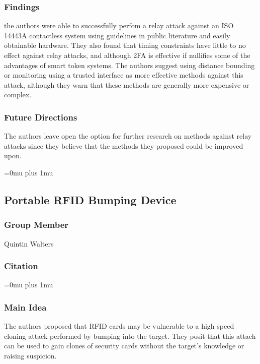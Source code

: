 \subsubsection{Findings}

\noindent
the authors were able to successfully perfom a relay attack against an ISO 14443A contactless system using guidelines in public literature and easily obtainable hardware. They also found that timing constraints have little to no effect against relay attacks, and although 2FA is effective if nullifies some of the advantages of smart token systems. The authors suggest using distance bounding or monitoring using a trusted interface as more effective methods against this attack, although they warn that these methods are generally more expensive or complex. 

\subsubsection{Future Directions}

\noindent
The authors leave open the option for further research on methods against relay attacks since they believe that the methods they proposed could be improved upon.

\Urlmuskip=0mu plus 1mu\relax

\noindent
\subsection{Portable RFID Bumping Device}

\subsubsection{Group Member}

\noindent
Quintin Walters

\noindent
\subsubsection{Citation}

\Urlmuskip=0mu plus 1mu\relax

\subsubsection{Main Idea}

\noindent
The authors proposed that RFID cards may be vulnerable to a high speed cloning attack performed by bumping into the target.  They posit that this attach can be used to gain clones of security cards without the target's knowledge or raising suspicion.

